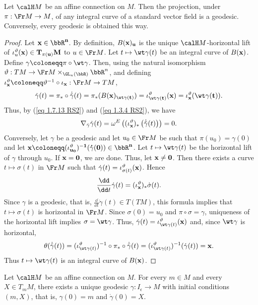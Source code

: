\begin{prop}[{{\cite[Prop.~2.1.22]{RS2}}}]\label{prop 2.1.22 RS2}
    Let $\calH M$ be an affine connection on $M$. Then the projection, under $\pi:\Fr M\to M$, of any integral curve of a standard vector field is a geodesic. Conversely, every geodesic is obtained this way.
\end{prop}
\begin{proof}
    Let $\bf{x}\in\bbR^n$. By definition, $B(\bf{x})_u$ is the unique $\calH M$-horizontal lift of $\iota_u^\vartheta(\bf{x})\in T_{\pi(u)}M$ to $u\in\Fr M$. Let $t\mapsto \wt\gamma(t)$ be an integral curve of $B(\bf{x})$. Define $\gamma\coloneqq \pi\circ\wt\gamma$. Then, using the natural isomorphism $\vartheta:TM\to \Fr M\times_{\GL_n(\bbR)}\bbR^n$, and defining $\iota_{\bf{x}}^\vartheta\coloneqq \vartheta^{-1}\circ\iota_{\bf{x}}:\Fr M\to TM$,
    \[\dot\gamma(t)=\pi_\ast\circ \dot{\tilde\gamma}(t)=\pi_\ast(B(\bf{x})_{\wt\gamma(t)})=\iota_{\wt\gamma(t)}^\vartheta(\bf{x})=\iota_{\bf{x}}^\vartheta(\wt\gamma(t)).\]
    Thus, by (\ref{eq 1.7.13 RS2}) and (\ref{eq 1.3.4 RS2}), we have 
    \[\nabla_{\dot\gamma}\dot\gamma(t)=\omega^E\left((\iota_{\bf{x}}^\vartheta)_\ast \left(\dot{\tilde\gamma}(t)\right)\right)=0.\]
    Conversely, let $\gamma$ be a geodesic and let $u_0\in\Fr M$ be such that $\pi(u_0)=\gamma(0)$ and let $\bf{x}\coloneqq (\iota_{u_0}^\vartheta)^{-1}(\dot\gamma(0))\in\bbR^n$. Let $t\mapsto \wt\gamma(t)$ be the horizontal lift of $\gamma$ through $u_0$. If $\bf{x}=0$, we are done. Thus, let $\bf{x}\neq 0$. Then there exists a curve $t\mapsto \sigma(t)$ in $\Fr M$ such that $\dot\gamma(t)=\iota_{\sigma(t)}^\vartheta(\bf{x})$. Hence 
    \[\frac{\dd}{\dd t}\dot\gamma(t)=(\iota^\vartheta_{\bf{x}})_\ast\dot\sigma(t).\] 
    Since $\gamma$ is a geodesic, that is, $\frac{\dd}{\dd t}\dot\gamma(t)\in T(TM)$, this formula implies that $t\mapsto \sigma(t)$ is horizontal in $\Fr M$. Since $\sigma(0)=u_0$ and $\pi\circ \sigma=\gamma$, uniqueness of the horizontal lift implies $\sigma=\wt\gamma$. Thus, $\dot\gamma(t)=\iota_{\wt\gamma(t)}^\vartheta(\bf{x})$ and, since $\wt\gamma$ is horizontal,
    \[\theta(\dot{\tilde\gamma}(t))=(\iota_{\wt\gamma(t)}^\vartheta)^{-1}\circ\pi_\ast\circ\dot{\tilde\gamma}(t)=
    (\iota_{\wt\gamma(t)}^\vartheta)^{-1}(\dot\gamma(t))=\bf{x}.\]
    Thus $t\mapsto \wt\gamma(t)$ is an integral curve of $B(\bf{x})$.
\end{proof}

\begin{cor}[{{\cite[Cor.~2.1.23]{RS2}}}]\label{cor 2.1.23 RS2}
    Let $\calH M$ be an affine connection on $M$. For every $m\in M$ and every $X\in T_mM$, there exists a unique geodesic $\gamma:I_\epsilon\to M$ with initial conditions $(m,X)$, that is, $\gamma(0)=m$ and $\dot\gamma(0)=X$.
\end{cor}

